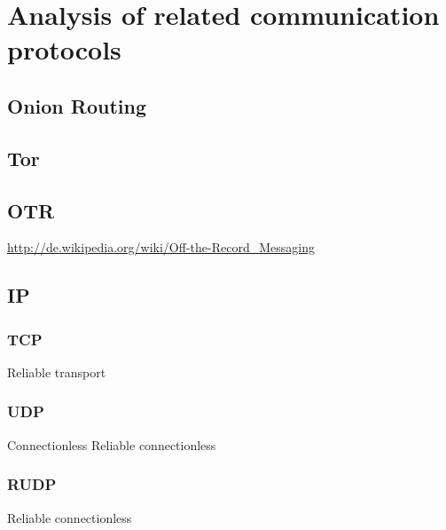 \chapter{Analysis of related communication protocols}
\section{Onion Routing}
\section{Tor}
\section{OTR}
\url{http://de.wikipedia.org/wiki/Off-the-Record_Messaging}
\section{IP}
\subsection{TCP}
Reliable transport
\subsection{UDP}
Connectionless
Reliable connectionless\cite{rfc768}
\subsection{RUDP}
Reliable connectionless\cite{rfc908,rfc1151}
